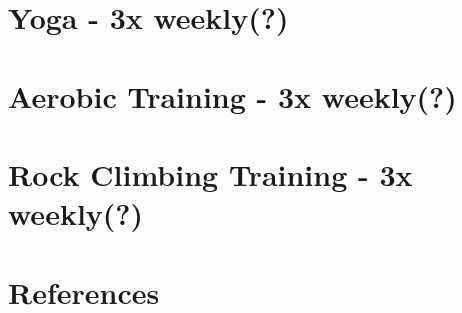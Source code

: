 \documentclass[12pt, letterpaper]{article}
\begin{document}
\newpage %


\section{Yoga - 3x weekly(?)}

\newpage %


\section{Aerobic Training - 3x weekly(?)}

\newpage %


\section{Rock Climbing Training - 3x weekly(?)}

\newpage %

\section{References}
\printbibliography[heading=none] 
\end{document}
